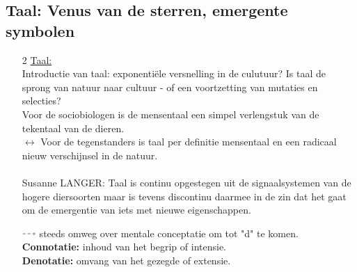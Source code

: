\documentclass[11pt,a4paper]{article}
\newcommand*{\DashedArrow}[1][]{\mathbin{\tikz [baseline=-0.25ex,-latex, dashed,#1] \draw [#1] (0pt,0.5ex) -- (1.3em,0.5ex);}}%
\begin{document}
\subsection{Taal: Venus van de sterren, emergente symbolen}
\begin{enumerate}
\item[2] \underline{Taal:}
\\
Introductie van taal: exponenti\"ele versnelling in de culutuur? Is taal de sprong van natuur naar cultuur - of een voortzetting van mutaties en selecties?
\\
Voor de sociobiologen is de mensentaal een simpel verlengstuk van de tekentaal van de dieren.
\\
$\leftrightarrow$ Voor de tegenstanders is taal per definitie mensentaal en een radicaal nieuw verschijnsel in de natuur.
\\
\\
Susanne LANGER:
Taal is continu opgestegen uit de signaalsystemen van de hogere diersoorten maar is tevens discontinu daarmee in de zin dat het gaat om de emergentie van iets met nieuwe eigenschappen.

\begin{center}
\end{center}

$\DashedArrow[->,densely dashed    ]$ steeds omweg over mentale conceptatie om tot "d" te komen.
\textbf{Connotatie:} inhoud van het begrip of intensie.
\\
\textbf{Denotatie:} omvang van het gezegde of extensie.
\\
\begin{center}
\end{center}
\end{enumerate}
\end{document}
